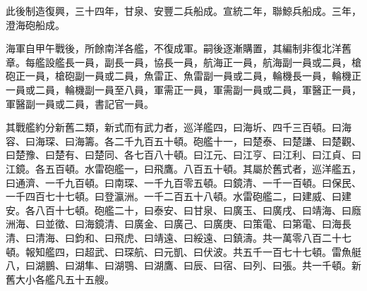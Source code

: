 \begin{pinyinscope}
此後制造復興，三十四年，甘泉、安豐二兵船成。宣統二年，聯鯨兵船成。三年，澄海砲船成。

海軍自甲午戰後，所餘南洋各艦，不復成軍。嗣後逐漸購置，其編制非復北洋舊章。每艦設艦長一員，副長一員，協長一員，航海正一員，航海副一員或二員，槍砲正一員，槍砲副一員或二員，魚雷正、魚雷副一員或二員，輪機長一員，輪機正一員或二員，輪機副一員至八員，軍需正一員，軍需副一員或二員，軍醫正一員，軍醫副一員或二員，書記官一員。

其戰艦約分新舊二類，新式而有武力者，巡洋艦四，曰海圻、四千三百頓。曰海容、曰海琛、曰海籌。各二千九百五十頓。砲艦十一，曰楚泰、曰楚謙、曰楚觀、曰楚豫、曰楚有、曰楚同、各七百八十頓。曰江元、曰江亨、曰江利、曰江貞、曰江鏡。各五百頓。水雷砲艦一，曰飛鷹。八百五十頓。其屬於舊式者，巡洋艦五，曰通濟、一千九百頓。曰南琛、一千九百零五頓。曰鏡清、一千一百頓。曰保民、一千四百七十七頓。曰登瀛洲。一千二百五十八頓。水雷砲艦二，曰建威、曰建安。各八百十七頓。砲艦二十，曰泰安、曰甘泉、曰廣玉、曰廣戌、曰靖海、曰廕洲海、曰並徵、曰海鏡清、曰廣金、曰廣己、曰廣庚、曰策電、曰第電、曰海長清、曰清海、曰鈞和、曰飛虎、曰靖遠、曰綏遠、曰鎮濤。共一萬零八百二十七頓。報知艦四，曰超武、曰琛航、曰元凱、曰伏波。共五千一百七十七頓。雷魚艇八，曰湖鵬、曰湖隼、曰湖鶚、曰湖鷹、曰辰、曰宿、曰列、曰張。共一千頓。新舊大小各艦凡五十五艘。


\end{pinyinscope}